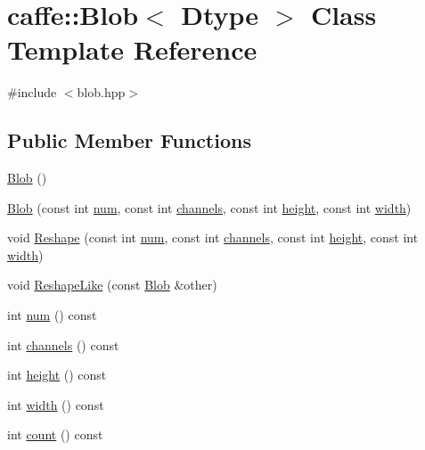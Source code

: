 \hypertarget{classcaffe_1_1_blob}{\section{caffe\+:\+:Blob$<$ Dtype $>$ Class Template Reference}
\label{classcaffe_1_1_blob}
}


{\ttfamily \#include $<$blob.\+hpp$>$}

\subsection*{Public Member Functions}
\begin{DoxyCompactItemize}
\item 
\hyperlink{classcaffe_1_1_blob_a5ec3bf9e25255c6071db8cfd1dc7f4e9}{Blob} ()
\item 
\hyperlink{classcaffe_1_1_blob_a379df830aad9b3cae253e1ddb0863844}{Blob} (const int \hyperlink{classcaffe_1_1_blob_a56c2b25db397d9e82bbd7c43597ae427}{num}, const int \hyperlink{classcaffe_1_1_blob_a744a987091c4496a2236898ee39558ec}{channels}, const int \hyperlink{classcaffe_1_1_blob_a422a10a605c30ac02a5377e7cf4c8c6c}{height}, const int \hyperlink{classcaffe_1_1_blob_a781b5410b7894455a85cd283cf8ee02a}{width})
\item 
void \hyperlink{classcaffe_1_1_blob_ad0e0a9a4f49478e89161c6afe4e341a0}{Reshape} (const int \hyperlink{classcaffe_1_1_blob_a56c2b25db397d9e82bbd7c43597ae427}{num}, const int \hyperlink{classcaffe_1_1_blob_a744a987091c4496a2236898ee39558ec}{channels}, const int \hyperlink{classcaffe_1_1_blob_a422a10a605c30ac02a5377e7cf4c8c6c}{height}, const int \hyperlink{classcaffe_1_1_blob_a781b5410b7894455a85cd283cf8ee02a}{width})
\item 
void \hyperlink{classcaffe_1_1_blob_aa8dee739aaa4253f73c44904784ce417}{Reshape\+Like} (const \hyperlink{classcaffe_1_1_blob}{Blob} \&other)
\item 
int \hyperlink{classcaffe_1_1_blob_a56c2b25db397d9e82bbd7c43597ae427}{num} () const 
\item 
int \hyperlink{classcaffe_1_1_blob_a744a987091c4496a2236898ee39558ec}{channels} () const 
\item 
int \hyperlink{classcaffe_1_1_blob_a422a10a605c30ac02a5377e7cf4c8c6c}{height} () const 
\item 
int \hyperlink{classcaffe_1_1_blob_a781b5410b7894455a85cd283cf8ee02a}{width} () const 
\item 
int \hyperlink{classcaffe_1_1_blob_abf97753a599dd546c16d55ba926d4e81}{count} () const 

\end{DoxyCompactItemize}
